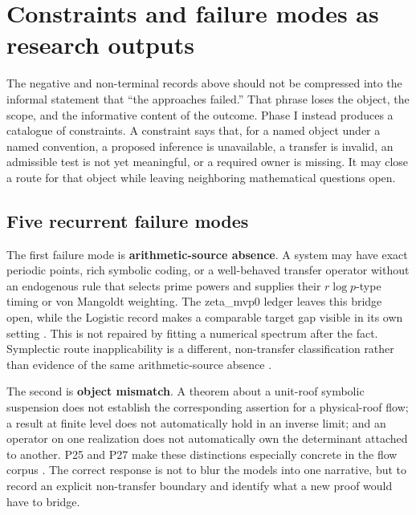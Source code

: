 \hypertarget{constraints-and-failure-modes-as-research-outputs}{%
\section{Constraints and failure modes as research outputs}\label{constraints-and-failure-modes-as-research-outputs}}

The negative and non-terminal records above should not be compressed into the informal statement that ``the approaches failed.'' That phrase loses the object, the scope, and the informative content of the outcome. Phase I instead produces a catalogue of constraints. A constraint says that, for a named object under a named convention, a proposed inference is unavailable, a transfer is invalid, an admissible test is not yet meaningful, or a required owner is missing. It may close a route for that object while leaving neighboring mathematical questions open.

\hypertarget{five-recurrent-failure-modes}{%
\subsection{Five recurrent failure modes}\label{five-recurrent-failure-modes}}

The first failure mode is \textbf{arithmetic-source absence}. A system may have exact periodic points, rich symbolic coding, or a well-behaved transfer operator without an endogenous rule that selects prime powers and supplies their \(r\log p\)-type timing or von Mangoldt weighting. The zeta\_mvp0 ledger leaves this bridge open, while the Logistic record makes a comparable target gap visible in its own setting  . This is not repaired by fitting a numerical spectrum after the fact. Symplectic route inapplicability is a different, non-transfer classification rather than evidence of the same arithmetic-source absence .

The second is \textbf{object mismatch}. A theorem about a unit-roof symbolic suspension does not establish the corresponding assertion for a physical-roof flow; a result at finite level does not automatically hold in an inverse limit; and an operator on one realization does not automatically own the determinant attached to another. P25 and P27 make these distinctions especially concrete in the flow corpus . The correct response is not to blur the models into one narrative, but to record an explicit non-transfer boundary and identify what a new proof would have to bridge.

